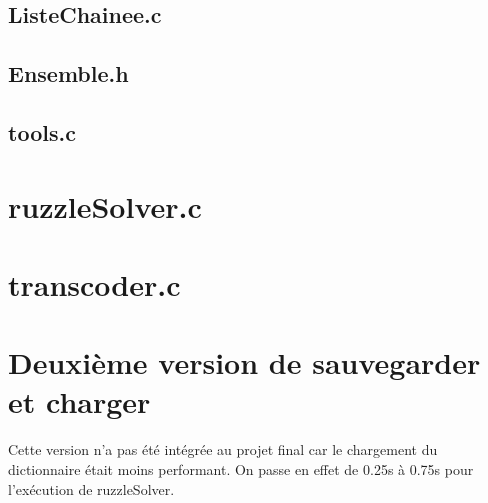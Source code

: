     \subsection{ListeChainee.c}
    \subsection{Ensemble.h}
    \subsection{tools.c}

  \section{ruzzleSolver.c}
  \section{transcoder.c}

\section{Deuxième version de sauvegarder et charger}
  Cette version n'a pas été intégrée au projet final car
  le chargement du dictionnaire était moins performant.
  On passe en effet de 0.25s à 0.75s pour l'exécution de
  ruzzleSolver.
